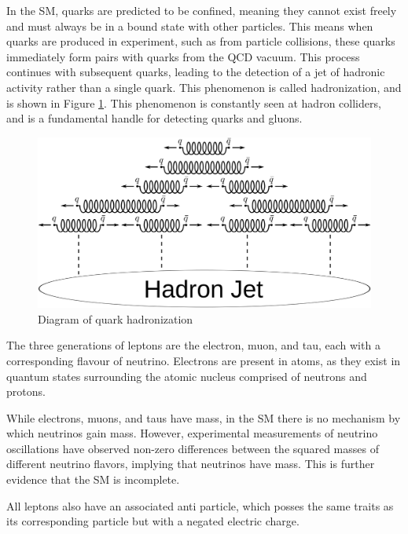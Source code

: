 
In the SM, quarks are predicted to be confined, meaning they cannot exist freely and must always be in a bound state with other particles. This means when quarks are produced in experiment, such as from particle collisions, these quarks immediately form pairs with quarks from the QCD vacuum. This process continues with subsequent quarks, leading to the detection of a jet of hadronic activity rather than a single quark. This phenomenon is called hadronization, and is shown in Figure \ref{fig:Quark_Hadronization}. This phenomenon is constantly seen at hadron colliders, and is a fundamental handle for detecting quarks and gluons.

\begin{figure}[H]
    \centering
    \includegraphics[width=\textwidth]{Images/Theory/Quark_confinement.png}
    \caption{Diagram of quark hadronization}
    \label{fig:Quark_Hadronization}
\end{figure}

The three generations of leptons are the electron, muon, and tau, each with a corresponding flavour of neutrino. Electrons are present in atoms, as they exist in quantum states surrounding the atomic nucleus comprised of neutrons and protons. 

While electrons, muons, and taus have mass, in the SM there is no mechanism by which neutrinos gain mass. However, experimental measurements of neutrino oscillations have observed non-zero differences between the squared masses of different neutrino flavors, implying that neutrinos have mass. This is further evidence that the SM is incomplete.  

All leptons also have an associated anti particle, which posses the same traits as its corresponding particle but with a negated electric charge. 

